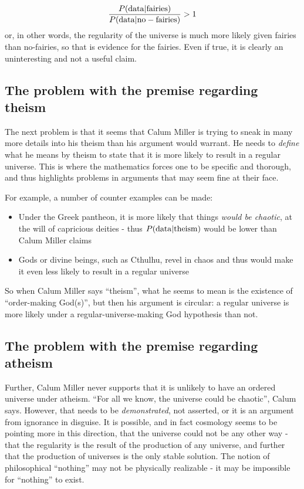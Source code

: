\begin{eqnarray*}
\frac{P({\rm data}|{\rm fairies})}{P({\rm data}|{\rm no-fairies})}>1
\end{eqnarray*}
or, in other words, the regularity of the universe is much more likely given fairies than no-fairies, so that is evidence for the fairies. Even if true, it is clearly an uninteresting and not a useful claim.

\subsection{The problem with the premise regarding
theism}\label{the-problem-with-the-premise-regarding-theism}

The next problem is that it seems that Calum Miller is  trying
to sneak in many more details into his theism than his argument would
warrant. He needs to \emph{define} what he means by theism to state that
it is more likely to result in a regular universe. This is where the mathematics forces one to be specific and thorough, and thus highlights problems in arguments that may seem fine at their face.

For example, a number of counter examples can be made:

\begin{itemize}
\item  Under the Greek pantheon, it is more likely that things {\em would be chaotic}, at the will of capricious deities - thus $P({\rm data}|{\rm theism})$ would be lower than Calum Miller claims
\item  Gods or divine beings, such as Cthulhu, revel in chaos and thus would make it even less likely to result in a regular universe
\end{itemize}

So when Calum Miller says ``theism'', what he seems to mean is the existence of ``order-making God(s)'', but then his argument is circular: a regular universe is more likely under a regular-universe-making God hypothesis than not.

\subsection{The problem with the premise regarding
atheism}\label{the-problem-with-the-premise-regarding-atheism}

Further, Calum Miller never supports that it is unlikely to have an ordered universe under atheism. ``For all
we know, the universe could be chaotic'', Calum says. However, that
needs to be \emph{demonstrated}, not asserted, or it is an argument from
ignorance in disguise. It is possible, and in fact cosmology seems to be
pointing more in this direction, that the universe could not be any
other way - that the regularity is the result of the production of any
universe, and further that the production of universes is the only
stable solution. The notion of philosophical ``nothing'' may not be
physically realizable - it may be impossible for ``nothing'' to exist.


